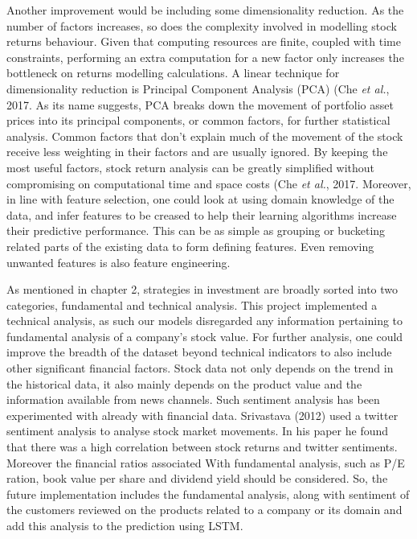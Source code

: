 Another improvement would be including some dimensionality reduction. As the number of factors increases, so does the complexity involved in modelling stock returns behaviour. Given that computing resources are finite, coupled with time constraints, performing an extra computation for a new factor only increases the bottleneck on returns modelling calculations. A linear technique for dimensionality reduction is Principal Component Analysis (PCA) (Che \textit{et al.}, 2017. As its name suggests, PCA breaks down the movement of portfolio asset prices into its principal components, or common factors, for further statistical analysis. Common factors that don't explain much of the movement of the stock receive less weighting in their factors and are usually ignored. By keeping the most useful factors, stock return analysis can be greatly simplified without compromising on computational time and space costs (Che \textit{et al.}, 2017. Moreover, in line with feature selection, one could look at using domain knowledge of the data, and infer features to be creased to help their learning algorithms increase their predictive performance. This can be as simple as grouping or bucketing related parts of the existing data to form defining features. Even removing unwanted features is also feature engineering. 


As mentioned in chapter 2, strategies in investment are broadly sorted into two categories, fundamental and technical analysis. This project implemented a technical analysis, as such our models disregarded any information pertaining to fundamental analysis of a company’s stock value. For further analysis, one could improve the breadth of the dataset beyond technical indicators to also include other significant financial factors. Stock data not only depends on the trend in the historical data, it also mainly depends on the product value and the information available from news channels. Such sentiment analysis has been experimented with already with financial data. Srivastava (2012) used a twitter sentiment analysis to analyse stock market movements. In his paper he found that there was a high correlation between stock returns and twitter sentiments. Moreover the financial ratios associated With fundamental analysis, such as P/E ration, book value per share and dividend yield should be considered. So, the future implementation includes the fundamental analysis, along with sentiment of the customers reviewed on the products related to a company or its domain and add this analysis to the prediction using LSTM. 



